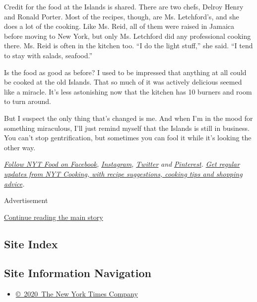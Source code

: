 Credit for the food at the Islands is shared. There are two chefs,
Delroy Henry and Ronald Porter. Most of the recipes, though, are Ms.
Letchford's, and she does a lot of the cooking. Like Ms. Reid, all of
them were raised in Jamaica before moving to New York, but only Ms.
Letchford did any professional cooking there. Ms. Reid is often in the
kitchen too. ``I do the light stuff,'' she said. ``I tend to stay with
salads, seafood.''

Is the food as good as before? I used to be impressed that anything at
all could be cooked at the old Islands. That so much of it was actively
delicious seemed like a miracle. It's less astonishing now that the
kitchen has 10 burners and room to turn around.

But I suspect the only thing that's changed is me. And when I'm in the
mood for something miraculous, I'll just remind myself that the Islands
is still in business. You can't stop gentrification, but sometimes you
can fool it while it's looking the other way.

\href{https://www.facebookcorewwwi.onion/nytfood/}{\emph{Follow NYT Food
on Facebook}}\emph{,}
\href{https://instagram.com/nytfood}{\emph{Instagram}}\emph{,}
\href{https://twitter.com/nytfood}{\emph{Twitter}} \emph{and}
\href{https://www.pinterest.com/nytfood/}{\emph{Pinterest}}\emph{.}
\href{https://www.nytimes3xbfgragh.onion/newsletters/cooking}{\emph{Get
regular updates from NYT Cooking, with recipe suggestions, cooking tips
and shopping advice}}\emph{.}

Advertisement

\protect\hyperlink{after-bottom}{Continue reading the main story}

\hypertarget{site-index}{%
\subsection{Site Index}\label{site-index}}

\hypertarget{site-information-navigation}{%
\subsection{Site Information
Navigation}\label{site-information-navigation}}

\begin{itemize}
\tightlist
\item
  \href{https://help.nytimes3xbfgragh.onion/hc/en-us/articles/115014792127-Copyright-notice}{©~2020~The
  New York Times Company}
\end{itemize}


